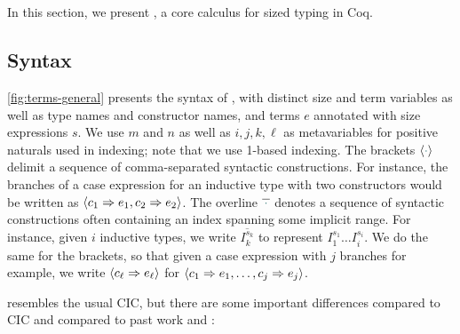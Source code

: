 \section{\titlelang}\label{sec:typing}
In this section, we present \lang, a core calculus for sized typing in Coq.

\subsection{Syntax}




\autoref{fig:terms-general} presents the syntax of \lang,
with distinct size and term variables as well as \coinductive type names and \coinductive constructor names,
and terms $e$ annotated with size expressions $s$.
We use $m$ and $n$ as well as $i, j, k, \ell$ as metavariables for positive naturals used in indexing; note that we use 1-based indexing.
The brackets $\seq{\ph}$ delimit a sequence of comma-separated syntactic constructions.
For instance, the branches of a case expression for an inductive type with two constructors would be written as $\langle c_1 \Rightarrow e_1, c_2 \Rightarrow e_2\rangle$.
The overline $\overline{\,\ph\,}$ denotes a sequence of syntactic constructions often containing an index spanning some implicit range.
For instance, given $i$ inductive types, we write $\overline{I^{s_k}_k}$ to represent $I^{s_1}_1 \dots I^{s_i}_i$.
We do the same for the brackets, so that given a case expression with $j$ branches for example, we write $\langle c_\ell \Rightarrow e_\ell\rangle$ for $\langle c_1 \Rightarrow e_1, \dots, c_j \Rightarrow e_j\rangle$.


\lang resembles the usual CIC, but there are some important differences compared to CIC and compared to past work \CIChat and \CIChatminus:

